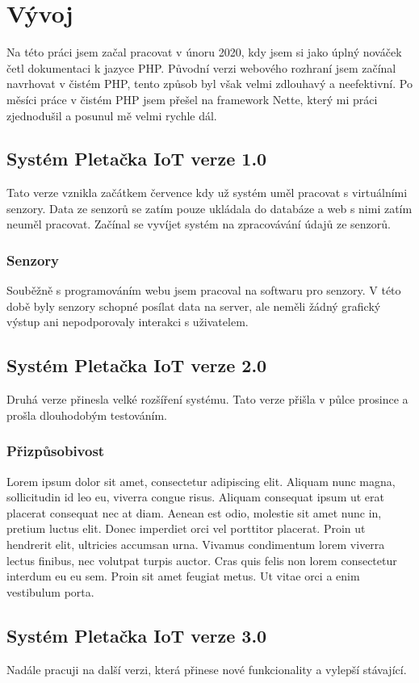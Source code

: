 \chapter{Vývoj}
Na této práci jsem začal pracovat v únoru 2020, kdy jsem si jako úplný nováček četl dokumentaci k jazyce PHP. 
Původní verzi webového rozhraní jsem začínal navrhovat v čistém PHP, tento způsob byl však velmi zdlouhavý a neefektivní.
Po měsíci práce v čistém PHP jsem přešel na framework Nette, který mi práci zjednodušil a posunul mě velmi rychle dál. 


\section{Systém Pletačka IoT verze 1.0}
Tato verze vznikla začátkem července kdy už systém uměl pracovat s virtuálními senzory.
Data ze senzorů se zatím pouze ukládala do databáze a web s nimi zatím neuměl pracovat.
Začínal se vyvíjet systém na zpracovávání údajů ze senzorů.


\subsection{Senzory}
Souběžně s programováním webu jsem pracoval na softwaru pro senzory.
V této době byly senzory schopné posílat data na server, ale neměli žádný grafický výstup ani nepodporovaly interakci s uživatelem.

\newpage
\section{Systém Pletačka IoT verze 2.0}
Druhá verze přinesla velké rozšíření systému.
Tato verze přišla v půlce prosince a prošla dlouhodobým testováním.



\subsection{Přizpůsobivost}
Lorem ipsum dolor sit amet, consectetur adipiscing elit.
Aliquam nunc magna, sollicitudin id leo eu, viverra congue risus.
Aliquam consequat ipsum ut erat placerat consequat nec at diam. 
Aenean est odio, molestie sit amet nunc in, pretium luctus elit. 
Donec imperdiet orci vel porttitor placerat. 
Proin ut hendrerit elit, ultricies accumsan urna. 
Vivamus condimentum lorem viverra lectus finibus, nec volutpat turpis auctor.
Cras quis felis non lorem consectetur interdum eu eu sem. 
Proin sit amet feugiat metus. 
Ut vitae orci a enim vestibulum porta. 



\section{Systém Pletačka IoT verze 3.0}
Nadále pracuji na další verzi, která přinese nové funkcionality a vylepší stávající. 

\newpage